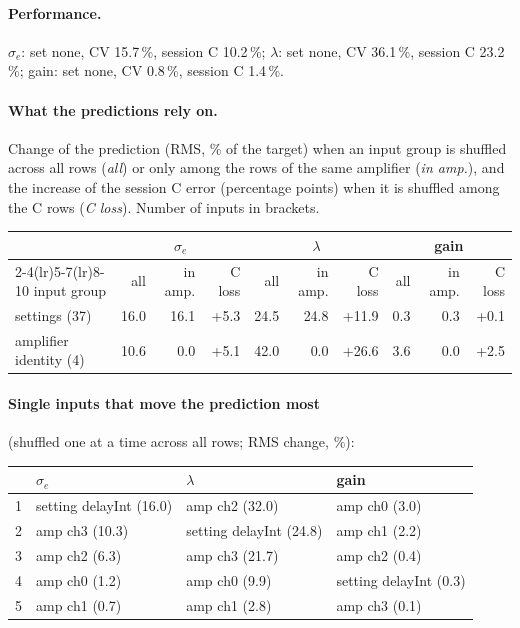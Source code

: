 \paragraph{Performance.}
$\sigma_e$: set none, CV 15.7\,\%, session C 10.2\,\%; $\lambda$: set none, CV 36.1\,\%, session C 23.2\,\%; gain: set none, CV 0.8\,\%, session C 1.4\,\%.
\paragraph{What the predictions rely on.} Change of the prediction (RMS, \% of the target) when an input group is shuffled across all rows (\emph{all}) or only among the rows of the same amplifier (\emph{in amp.}), and the increase of the session C error (percentage points) when it is shuffled among the C rows (\emph{C loss}). Number of inputs in brackets.
\begin{center}\footnotesize
\begin{tabular}{lrrrrrrrrr}
\toprule
 & \multicolumn{3}{c}{$\sigma_e$} & \multicolumn{3}{c}{$\lambda$} & \multicolumn{3}{c}{gain} \\
\cmidrule(lr){2-4}\cmidrule(lr){5-7}\cmidrule(lr){8-10}
input group & all & in amp. & C loss & all & in amp. & C loss & all & in amp. & C loss \\
\midrule
settings (37) & 16.0 & 16.1 & +5.3 & 24.5 & 24.8 & +11.9 & 0.3 & 0.3 & +0.1 \\
amplifier identity (4) & 10.6 & 0.0 & +5.1 & 42.0 & 0.0 & +26.6 & 3.6 & 0.0 & +2.5 \\
\bottomrule
\end{tabular}
\end{center}
\paragraph{Single inputs that move the prediction most} (shuffled one at a time across all rows; RMS change, \%):
\begin{center}\footnotesize
\begin{tabular}{rp{}p{}p{}}
\toprule
 & $\sigma_e$ & $\lambda$ & gain \\
\midrule
1 & setting delayInt (16.0) & amp ch2 (32.0) & amp ch0 (3.0) \\
2 & amp ch3 (10.3) & setting delayInt (24.8) & amp ch1 (2.2) \\
3 & amp ch2 (6.3) & amp ch3 (21.7) & amp ch2 (0.4) \\
4 & amp ch0 (1.2) & amp ch0 (9.9) & setting delayInt (0.3) \\
5 & amp ch1 (0.7) & amp ch1 (2.8) & amp ch3 (0.1) \\
\bottomrule
\end{tabular}
\end{center}
